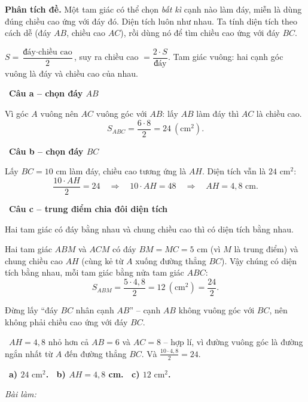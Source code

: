 \documentclass[11pt]{article}
\newif\ifsol \solfalse
\providecommand{\AnsWord}{Đáp số}
\newcommand{\ans}[1]{\par\smallskip{\bfseries\color{tmGreen!88!black}\AnsWord:}\ {\bfseries\color{AnsRed}#1}\par}
\newcommand{\probsol}[1]{%
  \begin{lrbox}{\solmeasure}\begin{minipage}{\dimexpr\linewidth-24pt\relax}#1\end{minipage}\end{lrbox}%
  \ifsol
    \begin{solbox}#1\end{solbox}%
  \else
    \setlength{\solht}{\dimexpr\ht\solmeasure+\dp\solmeasure+0.85cm\relax}%
    \ifdim\solht<1.35cm\setlength{\solht}{1.35cm}\fi
    \ifdim\solht>\StudentMaxWork\setlength{\solht}{\StudentMaxWork}\fi
    \begin{tcolorbox}[colback=white,colframe=Line,boxrule=0.8pt,arc=5pt,
      left=8pt,right=8pt,top=4pt,bottom=4pt,height=\solht]{\footnotesize\color{Slate}\itshape\WorkWord}\end{tcolorbox}%
  \fi}
\newlength{\StudentMaxWork}\setlength{\StudentMaxWork}{7.5cm}
\newcommand{\step}[2]{\par\smallskip\noindent{\bfseries\color{tmBlue!85!black}\StepWord~#1.}\ {\bfseries #2}\par\nopagebreak}
\newcommand{\verify}[1]{\par\smallskip\noindent{\bfseries\color{tmGreen!80!black}\faCheckCircle\ \CheckWord}\ #1\par}
\def\WorkWord{Bài làm:}
\def\AnsWord{Đáp số}
\def\StepWord{Bước}
\def\CheckWord{Thử lại:}
\begin{document}
\probsol{
\textbf{Phân tích đề.} Một tam giác có thể chọn \emph{bất kì} cạnh nào làm đáy, miễn là dùng đúng chiều cao ứng với đáy đó. Diện tích luôn như nhau. Ta tính diện tích theo cách dễ (đáy $AB$, chiều cao $AC$), rồi dùng nó để tìm chiều cao ứng với đáy $BC$.
\begin{recallbox}$S=\dfrac{\text{đáy}\cdot\text{chiều cao}}{2}$, suy ra chiều cao $=\dfrac{2\cdot S}{\text{đáy}}$. Tam giác vuông: hai cạnh góc vuông là đáy và chiều cao của nhau.\end{recallbox}
\step{1}{Câu a -- chọn đáy $AB$}
Vì góc $A$ vuông nên $AC$ vuông góc với $AB$: lấy $AB$ làm đáy thì $AC$ là chiều cao.
\[ S_{ABC}=\frac{6\cdot8}{2}=24\ (\text{cm}^2). \]

\step{2}{Câu b -- chọn đáy $BC$}
Lấy $BC=10$ cm làm đáy, chiều cao tương ứng là $AH$. Diện tích vẫn là $24\text{ cm}^2$:
\[ \frac{10\cdot AH}{2}=24\quad\Rightarrow\quad 10\cdot AH=48\quad\Rightarrow\quad AH=4{,}8\text{ cm}. \]

\step{3}{Câu c -- trung điểm chia đôi diện tích}
\begin{recallbox}Hai tam giác có đáy bằng nhau và chung chiều cao thì có diện tích bằng nhau.\end{recallbox}
Hai tam giác $ABM$ và $ACM$ có đáy $BM=MC=5$ cm (vì $M$ là trung điểm) và chung chiều cao $AH$ (cùng kẻ từ $A$ xuống đường thẳng $BC$). Vậy chúng có diện tích bằng nhau, mỗi tam giác bằng nửa tam giác $ABC$:
\[ S_{ABM}=\frac{5\cdot4{,}8}{2}=12\ (\text{cm}^2)=\frac{24}{2}. \]
\begin{warnbox}Đừng lấy ``đáy $BC$ nhân cạnh $AB$'' -- cạnh $AB$ không vuông góc với $BC$, nên không phải chiều cao ứng với đáy $BC$.\end{warnbox}
\verify{$AH=4{,}8$ nhỏ hơn cả $AB=6$ và $AC=8$ -- hợp lí, vì đường vuông góc là đường ngắn nhất từ $A$ đến đường thẳng $BC$. Và $\frac{10\cdot4{,}8}{2}=24$.}
\ans{a) $24\text{ cm}^2$. \ b) $AH=4{,}8$ cm. \ c) $12\text{ cm}^2$.}
}

\providecommand{\tbGrid}[4]{\begin{tikzpicture}[baseline=0.2cm,x=0.5cm,y=0.5cm]
  \draw[Ink,line width=0.7pt] (0,0) grid[step=1] (2,2);
  \node[font=\sffamily\bfseries,text=tmBlue!80!black,inner sep=0pt,#4] at (#1,#2) {#3};\end{tikzpicture}}
\providecommand{\tbG}[6]{\draw[Ink,line width=0.7pt] (#1,#2) grid[step=0.5] ++(1,1);
  \node[font=\sffamily\bfseries,text=tmBlue!80!black,inner sep=0pt,#6] at ({#1+#3},{#2+#4}) {#5};}
\end{document}
